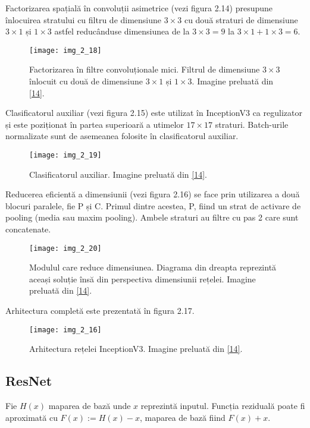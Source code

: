 Factorizarea spațială în convoluții asimetrice (vezi figura 2.14) presupune înlocuirea stratului cu filtru de dimensiune $3 \times 3$ cu două straturi de dimensiune $3 \times 1$ și $1 \times 3$ astfel reducânduse dimensiunea de la $3 \times 3 = 9$ la $3 \times 1 + 1 \times 3 = 6$. 
\begin{figure}[!h]
	\centering
	\texttt{[image: img\_2\_18]}
	\caption[Factorizarea spațială în convoluții asimetrice]{Factorizarea în filtre convoluționale mici. Filtrul de dimensiune $3 \times 3$ înlocuit cu două de dimensiune $3 \times 1$ și $1 \times 3$.  Imagine preluată din \hyperlink{guideinceptionv3}{[14]}.}
\end{figure}

Clasificatorul auxiliar (vezi figura 2.15) este utilizat în InceptionV3 ca regulizator și este poziționat în partea superioară a utimelor $17 \times 17$ straturi. Batch-urile normalizate sunt de asemeanea folosite în clasificatorul auxiliar.
\begin{figure}[!h]
	\centering
	\texttt{[image: img\_2\_19]}
	\caption[Clasificator auxiliar]{Clasificatorul auxiliar. Imagine preluată din \hyperlink{guideinceptionv3}{[14]}.}
\end{figure}

Reducerea eficientă a dimensiunii (vezi figura 2.16) se face prin utilizarea a două blocuri paralele, fie P și C. Primul dintre acestea, P, fiind un strat de activare de pooling (media sau maxim pooling). Ambele straturi au filtre cu pas 2 care sunt concatenate.
\begin{figure}[!h]
	\centering
	\texttt{[image: img\_2\_20]}
	\caption[Reducerea eficientă a dimensiunii]{Modulul care reduce dimensiunea. Diagrama din dreapta reprezintă aceași soluție însă din perspectiva dimensiunii rețelei. Imagine preluată din \hyperlink{guideinceptionv3}{[14]}.}
\end{figure}   

Arhitectura completă este prezentată în figura 2.17.
\begin{figure}[!h]
	\centering
	\texttt{[image: img\_2\_16]}
	\caption[Arhitectura InceptionV3]{Arhitectura rețelei InceptionV3. Imagine preluată din \hyperlink{guideinceptionv3}{[14]}.}
\end{figure}   


\subsection{ResNet}
Fie $H(x)$ maparea de bază unde $x$ reprezintă inputul. Funcția reziduală poate fi aproximată cu $F(x) := H(x) - x$, maparea de bază fiind $F(x) + x$.

